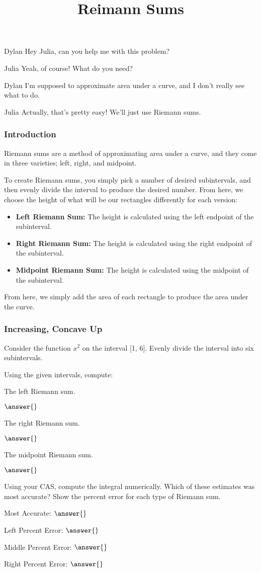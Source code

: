 \documentclass{ximera}
\title{Reimann Sums}
\begin{document}
\maketitle
\begin{dialogue}
\item[Dylan] Hey Julia, can you help me with this problem?
\item[Julia] Yeah, of course! What do you need?
\item[Dylan] I'm supposed to approximate area under a curve, and I don't really see what to do.
\item[Julia] Actually, that's pretty easy! We'll just use Riemann sums.
\end{dialogue}

\subsubsection{Introduction}
Riemann sums are a method of approximating area under a curve, and they come in three varieties; left, right, and midpoint.

To create Riemann sums, you simply pick a number of desired subintervals, and then evenly divide the interval to produce the desired number. From here, we choose the height of what will be our rectangles differently for each version:
\begin{itemize}
\item{\textbf{Left Riemann Sum:} The height is calculated using the left endpoint of the subinterval.}
\item{\textbf{Right Riemann Sum:} The height is calculated using the right endpoint of the subinterval.}
\item{\textbf{Midpoint Riemann Sum:} The height is calculated using the midpoint of the subinterval.}
\end{itemize}

From here, we simply add the area of each rectangle to produce the area under the curve.

\subsubsection{Increasing, Concave Up}
Consider the function $x^2$ on the interval [1, 6]. Evenly divide the interval into six subintervals.
\begin{question}
Using the given intervals, compute:

The left Riemann sum.

$\answer{}$

The right Riemann sum.

$\answer{}$

The midpoint Riemann sum.

$\answer{}$

Using your CAS, compute the integral numerically. Which of these estimates was most accurate? Show the percent error for each type of Riemann sum.

Most Accurate: $\answer{}$

Left Percent Error: $\answer{}$

Middle Percent Error: $\answer{}$

Right Percent Error: $\answer{}$
\end{question}
\end{document}
